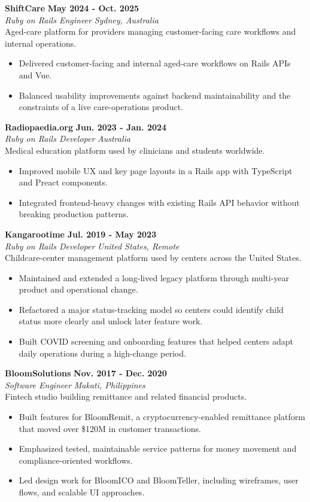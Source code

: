 \documentclass[10pt,letterpaper]{article}
\newcommand{\roleentry}[4]{%
  \Needspace{5\baselineskip}%
  \textbf{#1} \hfill \textbf{#2}\\
  \textit{#3} \hfill \textit{#4}\\[-2pt]
}
\newcommand{\roleblurb}[1]{%
  #1\\[-2pt]
}
\begin{document}
\roleentry{ShiftCare}{May 2024 - Oct. 2025}{Ruby on Rails Engineer}{Sydney, Australia}
\roleblurb{Aged-care platform for providers managing customer-facing care workflows and internal operations.}
\begin{itemize}
  \item Delivered customer-facing and internal aged-care workflows on Rails APIs and Vue.
  \item Balanced usability improvements against backend maintainability and the constraints of a live care-operations product.
\end{itemize}

\roleentry{Radiopaedia.org}{Jun. 2023 - Jan. 2024}{Ruby on Rails Developer}{Australia}
\roleblurb{Medical education platform used by clinicians and students worldwide.}
\begin{itemize}
  \item Improved mobile UX and key page layouts in a Rails app with TypeScript and Preact components.
  \item Integrated frontend-heavy changes with existing Rails API behavior without breaking production patterns.
\end{itemize}

\roleentry{Kangarootime}{Jul. 2019 - May 2023}{Ruby on Rails Developer}{United States, Remote}
\roleblurb{Childcare-center management platform used by centers across the United States.}
\begin{itemize}
  \item Maintained and extended a long-lived legacy platform through multi-year product and operational change.
  \item Refactored a major status-tracking model so centers could identify child status more clearly and unlock later feature work.
  \item Built COVID screening and onboarding features that helped centers adapt daily operations during a high-change period.
\end{itemize}

\roleentry{BloomSolutions}{Nov. 2017 - Dec. 2020}{Software Engineer}{Makati, Philippines}
\roleblurb{Fintech studio building remittance and related financial products.}
\begin{itemize}
  \item Built features for BloomRemit, a cryptocurrency-enabled remittance platform that moved over \$120M in customer transactions.
  \item Emphasized tested, maintainable service patterns for money movement and compliance-oriented workflows.
  \item Led design work for BloomICO and BloomTeller, including wireframes, user flows, and scalable UI approaches.
\end{itemize}
\end{document}
